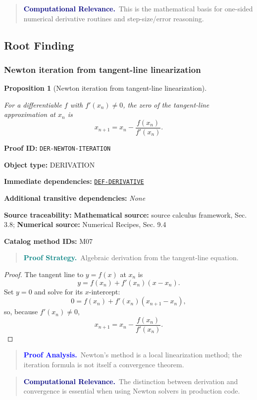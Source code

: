 \documentclass[10pt]{article}
\newcommand{\pidraw}[1]{\begingroup\urlstyle{tt}\nolinkurl{#1}\endgroup}
\newcommand{\pidref}[1]{\hyperref[prf:#1]{\pidraw{#1}}}
\newtheorem{proposition}[theorem]{Proposition}
\theoremstyle{definition}
\theoremstyle{remark}
\newenvironment{proofstrategy}
{\begin{quote}\small\noindent\textbf{\textcolor{teal}{Proof Strategy.}}\ }
{\end{quote}}
\newenvironment{proofanalysis}
{\begin{quote}\small\noindent\textbf{\textcolor{blue}{Proof Analysis.}}\ }
{\end{quote}}
\newenvironment{computationalrelevance}
{\begin{quote}\small\noindent\textbf{\textcolor{navy}{Computational Relevance.}}\ }
{\end{quote}}
\newcommand{\meta}[2]{\noindent\textbf{#1:} #2\par}
\begin{document}
\begin{computationalrelevance}This is the mathematical basis for one-sided numerical derivative routines and step-size/error reasoning.\end{computationalrelevance}

\subsection{Root Finding}

\subsubsection{Newton iteration from tangent-line linearization}

\begin{proposition}[Newton iteration from tangent-line linearization]\label{prf:DER-NEWTON-ITERATION}

For a differentiable $f$ with $f'(x_n)\ne0$, the zero of the tangent-line approximation at $x_n$ is
\[
x_{n+1}=x_n-\frac{f(x_n)}{f'(x_n)}.
\]

\end{proposition}

\meta{Proof ID}{\pidraw{DER-NEWTON-ITERATION}}
\meta{Object type}{DERIVATION}
\meta{Immediate dependencies}{\pidref{DEF-DERIVATIVE}}
\meta{Additional transitive dependencies}{\emph{None}}
\meta{Source traceability}{\textbf{Mathematical source:} source calculus framework, Sec. 3.8; \textbf{Numerical source:} Numerical Recipes, Sec. 9.4}
\meta{Catalog method IDs}{M07}

\begin{proofstrategy}Algebraic derivation from the tangent-line equation.\end{proofstrategy}

\begin{proof}

The tangent line to $y=f(x)$ at $x_n$ is
\[
y=f(x_n)+f'(x_n)(x-x_n).
\]
Set $y=0$ and solve for its $x$-intercept:
\[
0=f(x_n)+f'(x_n)(x_{n+1}-x_n),
\]
so, because $f'(x_n)\ne0$,
\[
x_{n+1}=x_n-\frac{f(x_n)}{f'(x_n)}.
\]

\end{proof}

\begin{proofanalysis}Newton's method is a local linearization method; the iteration formula is not itself a convergence theorem.\end{proofanalysis}

\begin{computationalrelevance}The distinction between derivation and convergence is essential when using Newton solvers in production code.\end{computationalrelevance}
\end{document}
